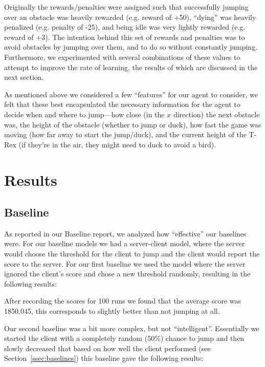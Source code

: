 \documentclass{scrartcl}
\begin{document}
    Originally the rewards/penalties were assigned such that successfully
    jumping over an obstacle was heavily rewarded (e.g. reward of +50),
    ``dying'' was heavily penalized (e.g. penalty of -25), and being idle was
    very lightly rewarded (e.g. reward of +3). The intention behind this set of
    rewards and penalties was to avoid obstacles by jumping over them, and to do
    so without constantly jumping. Furthermore, we experimented with several
    combinations of these values to attempt to improve the rate of learning, the
    results of which are discussed in the next section.

    As mentioned above we considered a few ``features'' for our agent to
    consider, we felt that these best encapsulated the necessary information for
    the agent to decide when and where to jump---how close (in the $x$
    direction) the next obstacle was, the height of the obstacle (whether to
    jump or duck), how fast the game was moving (how far away to start the
    jump/duck), and the current height of the T-Rex (if they're in the air,
    they might need to duck to avoid a bird).

\section{Results}

    \subsection{Baseline}
    As reported in our Baseline report, we analyzed how ``effective'' our
    baselines were. For our baseline models we had a server-client model, where
    the server would choose the threshold for the client to jump and the client
    would report the score to the server. For our first baseline we used the
    model where the server ignored the client's score and chose a new threshold
    randomly, resulting in the following results:

    After recording the scores for 100 runs we found that the average score was
    1850.045, this corresponds to slightly better than not jumping at all.

    Our second baseline was a bit more complex, but not ``intelligent''.
    Essentially we started the client with a completely random (50\%) chance to
    jump and then slowly decreased that based on how well the client performed
    (see Section~\ref{ssec:baselines}) this baseline gave the following results:
\end{document}
